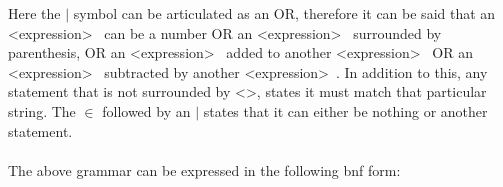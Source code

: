 Here the $|$ symbol can be articulated as an OR, therefore it can be said that an \textless expression\textgreater~ can be a number OR an \textless expression\textgreater~ surrounded by parenthesis, OR an \textless expression\textgreater~ added to another \textless expression\textgreater~ OR an \textless expression\textgreater~ subtracted by another \textless expression\textgreater~. In addition to this, any statement that is not surrounded by \textless \textgreater, states it must match that particular string. The $\in$ followed by an $|$ states that it can either be nothing or another statement.\\
\\
The above grammar can be expressed in the following \acrshort{bnf} form:
\onehalfspacing
\begin{bnf*}
		{}\\
		\\
		\\
\end{bnf*}

